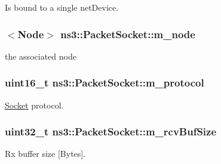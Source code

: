 Is bound to a single net\+Device. 

\subsubsection[{\texorpdfstring{m\+\_\+node}{m_node}}]{$<${\bf Node}$>$ ns3\+::\+Packet\+Socket\+::m\+\_\+node\hspace{0.3cm}{\ttfamily [private]}}\hypertarget{classns3_1_1PacketSocket_a1d16a7bb40df82877d5b6b257861d566}{}\label{classns3_1_1PacketSocket_a1d16a7bb40df82877d5b6b257861d566}


the associated node 

\subsubsection[{\texorpdfstring{m\+\_\+protocol}{m_protocol}}]{\setlength{\rightskip}{0pt plus 5cm}uint16\+\_\+t ns3\+::\+Packet\+Socket\+::m\+\_\+protocol\hspace{0.3cm}{\ttfamily [private]}}\hypertarget{classns3_1_1PacketSocket_ab563605d15111f7caef9a0c9ca18167c}{}\label{classns3_1_1PacketSocket_ab563605d15111f7caef9a0c9ca18167c}


\hyperlink{classns3_1_1Socket}{Socket} protocol. 

\subsubsection[{\texorpdfstring{m\+\_\+rcv\+Buf\+Size}{m_rcvBufSize}}]{\setlength{\rightskip}{0pt plus 5cm}uint32\+\_\+t ns3\+::\+Packet\+Socket\+::m\+\_\+rcv\+Buf\+Size\hspace{0.3cm}{\ttfamily [private]}}\hypertarget{classns3_1_1PacketSocket_a77f51ae1c17685fee11e5e10d90bd2f4}{}\label{classns3_1_1PacketSocket_a77f51ae1c17685fee11e5e10d90bd2f4}


Rx buffer size \mbox{[}Bytes\mbox{]}. 

